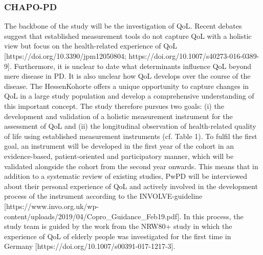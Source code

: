 \subsubsection{\acl{CHAPO-PD}}
The backbone of the study will be the investigation of QoL. Recent debates suggest that established measurement tools do not capture QoL with a holistic view but focus on the health-related experience of QoL [https://doi.org/10.3390/jpm12050804; https://doi.org/10.1007/s40273-016-0389-9]. Furthermore, it is unclear to date what determinants influence QoL beyond mere disease in PD. It is also unclear how QoL develops over the course of the disease. The HessenKohorte offers a unique opportunity to capture changes in QoL in a large study population and develop a comprehensive understanding of this important concept. The study therefore pursues two goals: (i) the development and validation of a holistic measurement instrument for the assessment of QoL and (ii) the longitudinal observation of health-related quality of life using established measurement instruments (cf. Table 1). 
To fulfil the first goal, an instrument will be developed in the first year of the cohort in an evidence-based, patient-oriented and participatory manner, which will be validated alongside the cohort from the second year onwards.  This means that in addition to a systematic review of existing studies, PwPD will be interviewed about their personal experience of QoL and actively involved in the development process of the instrument according to the INVOLVE-guideline [https://www.invo.org.uk/wp-content/uploads/2019/04/Copro_Guidance_Feb19.pdf]. In this process, the study team is guided by the work from the NRW80+ study in which the experience of QoL of elderly people was investigated for the first time in Germany [https://doi.org/10.1007/s00391-017-1217-3].

